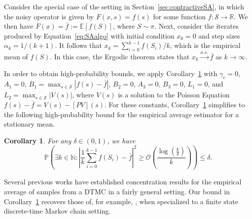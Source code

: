 \documentclass{article}
\newcommand{\lrp}[1]{\left( #1 \right)}
\newcommand{\lrs}[1]{\left[ #1 \right]}
\newcommand{\E}[1]{\mathbb{E}\lrs{#1}}
\newcommand{\R}{\mathbb{R}}
\newcommand{\N}{\mathbb{N}}
\newtheorem{corollary}{Corollary}[theorem]
\begin{document}
\medskip

Consider the special case of the setting in Section~\ref{sec:contractiveSA}, in which the noisy operator is given by $F(x,s) = f(s)$ for some function $f:\mathcal S \rightarrow \R$. We then have $\bar{F}(x) = \bar{f}:= \E{f(S)}$, where ${S\sim\pi}$. Next, consider the iterates produced by Equation~\eqref{eq:SAalgo} with initial condition $x_0 = 0$ and step sizes $\alpha_k = 1/(k+1)$. It follows that $x_k = \sum\nolimits_{i=0}^{k-1}f(S_i)/k$, which is the empirical mean of $f(S)$. In this case, the Ergodic theorem \citep[Theorem 5.2.1]{douc2018markov} states that $x_k \xrightarrow{a.s.} \bar{f}$ as $k\rightarrow \infty$. 

In order to obtain high-probability bounds, we apply Corollary~\ref{cor:markovempmeanconc} with $\gamma_c = 0$, $A_1=  0$, $B_1 = \max_{s\in\mathcal{{S}}} |f(s) - \bar{f}|$, $B_2=  0$, $A_3 = 0$, $B_3 = 0$, $L_1 = 0$, and $L_2 = \max_{s\in\mathcal S} |V(s)|$, where $V(s)$ is a solution to the Poisson Equation $f(s) - \bar{f} = V(s) - [PV](s)$. For these constants, Corollary~\ref{cor:markovempmeanconc} simplifies to the following high-probability bound for the empirical average estimator for a stationary mean. 

\begin{corollary} \label{cor:markovempmeanconc}
    For any $\delta\in (0,1)$, we have
    \[  \mathbb{P}\lrp{ \exists k \in \N : \left|\frac{1}{k}\sum\limits_{i=0}^{k-1} f(S_i) - \bar{f}\right|^2 \ge \mathcal{O}\lrp{ \frac{\log\left(\frac{k}{\delta}\right)}{k} } }\le \delta. \]
\end{corollary}
Several previous works have established concentration results for the empirical average of samples from a DTMC in a fairly general setting. Our bound in Corollary~\ref{cor:markovempmeanconc} recovers those of, for example,  \cite{glynn2002hoeffding,boucher2009hoeffding,liu2021hoeffding,chung2012chernoff, paulin2015concentration},  when specialized to a finite state discrete-time Markov chain setting.

\end{document}

